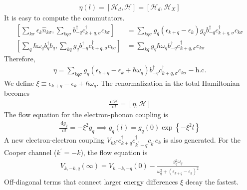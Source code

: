 \documentclass[twoside]{report}
\numberwithin{equation}{section}
\begin{document}
\begin{equation}\begin{aligned}
	\eta(l) = \left[\mathcal{H}_d,\mathcal{H}\right] = \left[\mathcal{H}_d,\mathcal{H}_X\right]
\end{aligned}\end{equation}
It is easy to compute the commutators.
\begin{equation}\begin{aligned}
	\left[\sum_{k\sigma}\epsilon_k \hat n_{k\sigma},\sum_{kq\sigma}b^\dagger_{-q}c^\dagger_{k+q,\sigma}c_{k\sigma}\right]  &= \sum_{kq\sigma}g_q\left(\epsilon_{k+q} - \epsilon_k\right)g_qb^\dagger_{-q}c^\dagger_{k+q,\sigma}c_{k\sigma}\\
	\left[\sum_{q}\hbar \omega_q b^\dagger_q b_q,\sum_{kq}g_{q}b^\dagger_{-q}c^\dagger_{k+q,\sigma}c_{k\sigma}\right]  &= \sum_{kq}g_q \hbar \omega_q b^\dagger_{-q}c^\dagger_{k+q,\sigma}c_{k\sigma}
\end{aligned}\end{equation}
Therefore,
\begin{equation}\begin{aligned}
	\eta =\sum_{kq\sigma}g_q\left(\epsilon_{k+q} - \epsilon_k + \hbar\omega_q\right)b^\dagger_{-q}c^\dagger_{k+q,\sigma}c_{k\sigma} - \text{h.c.}
\end{aligned}\end{equation}
We define \(\xi \equiv \epsilon_{k+q} - \epsilon_k + \hbar\omega_q\). The renormalization in the total Hamiltonian becomes
\begin{equation}\begin{aligned}
	\frac{\:\mathrm{d}\mathcal{H}}{\:\mathrm{d}l} = \left[\eta,\mathcal{H}\right]
\end{aligned}\end{equation}
The flow equation for the electron-phonon coupling is
\begin{equation}\begin{aligned}
	\frac{\:\mathrm{d}g_q}{\:\mathrm{d}l} = -\xi^2g_q \implies g_q(l) = g_q(0)\exp\left\{-\xi^2 l\right\} 
\end{aligned}\end{equation}
A new electron-electron coupling \(V_{kk^ q}c^\dagger_{k+q}c^\dagger_{k^\prime -q}c_{k^\prime}c_k\) is also generated. For the Cooper channel (\(k^\prime = -k\)), the flow equation is
\begin{equation}\begin{aligned}
	V_{k,-k,q}(\infty) = V_{k,-k,-q}(0) - \frac{g_q^2\omega_q}{\omega_q^2 + \left(\epsilon_{k+q} - \epsilon_k\right)^2}
\end{aligned}\end{equation}
Off-diagonal terms that connect larger energy differences \(\xi\) decay the fastest.
\end{document}
